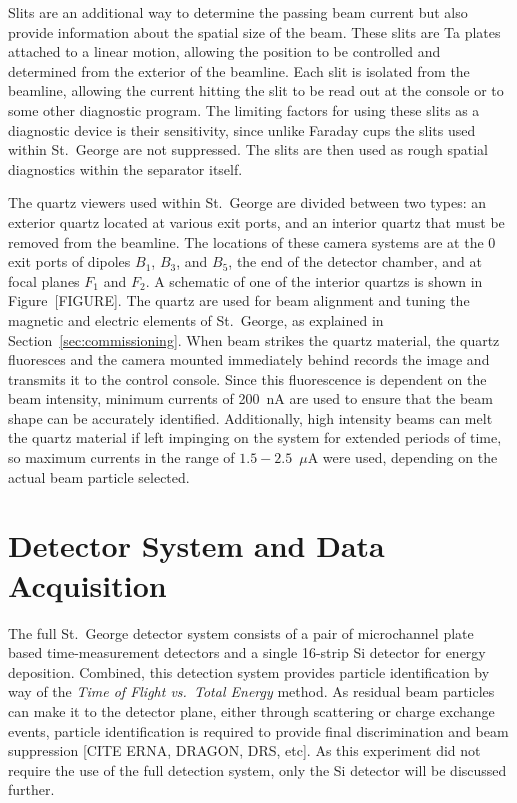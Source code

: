 Slits are an additional way to determine the passing beam current but
also provide information about the spatial size of the beam. These slits
are Ta plates attached to a linear motion, allowing the position to be
controlled and determined from the exterior of the beamline. Each slit
is isolated from the beamline, allowing the current hitting the slit to
be read out at the console or to some other diagnostic program. The
limiting factors for using these slits as a diagnostic device is their
sensitivity, since unlike Faraday cups the slits used within St.\ George
are not suppressed. The slits are then used as rough spatial diagnostics
within the separator itself.

The quartz viewers used within St.\ George are divided between two
types: an exterior quartz located at various exit ports, and an interior
quartz that must be removed from the beamline. The locations of these
camera systems are at the 0\degree{} exit ports of dipoles $B_1$, $B_3$,
and $B_5$, the end of the detector chamber, and at focal planes $F_1$
and $F_2$. A schematic of one of the interior quartzs is shown in
Figure~[FIGURE]. The quartz are used for beam alignment and tuning the
magnetic and electric elements of St.\ George, as explained in
Section~\ref{sec:commissioning}. When beam strikes the quartz material,
the quartz fluoresces and the camera mounted immediately behind records
the image and transmits it to the control console. Since this
fluorescence is dependent on the beam intensity, minimum currents of
200~nA are used to ensure that the beam shape can be accurately
identified. Additionally, high intensity beams can melt the quartz
material if left impinging on the system for extended periods of time,
so maximum currents in the range of $1.5-2.5$~$\mu$A were used,
depending on the actual beam particle selected.


\section{Detector System and Data Acquisition}
\label{sec:detector}

The full St.\ George detector system consists of a pair of microchannel
plate based time-measurement detectors and a single 16-strip Si detector
for energy deposition. Combined, this detection system provides particle
identification by way of the \textit{Time of Flight vs.\ Total Energy}
method. As residual beam particles can make it to the detector plane,
either through scattering or charge exchange events, particle
identification is required to provide final discrimination and beam
suppression [CITE ERNA, DRAGON, DRS, etc]. As this experiment did not
require the use of the full detection system, only the Si detector will
be discussed further.

